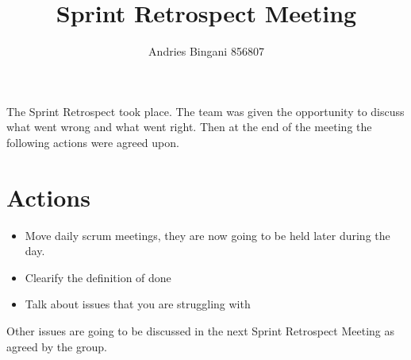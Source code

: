 \documentclass[10pt,a4paper]{article}
\author{Andries Bingani 856807}
\title{Sprint Retrospect Meeting}
\begin{document}
\maketitle

The Sprint Retrospect took place. The team was given the opportunity to discuss what went wrong and what went right. Then at the end of the meeting the following actions were agreed upon.
\section*{Actions}
\begin{itemize}
\item Move daily scrum meetings, they are now going to be held later during the day.
\item Clearify the definition of done
\item Talk about issues that you are struggling with
\end{itemize}
Other issues are going to be discussed in the next Sprint Retrospect Meeting as agreed by the group. 
\end{document}
